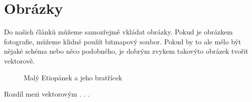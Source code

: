 \documentclass[a4paper, 11pt]{article}
\begin{document}
\section{Obrázky}
Do našich článků můžeme samozřejmě vkládat obrázky. Pokud je obrázkem fotografie, můžeme klidně použít bitmapový soubor. Pokud by to ale mělo být nějaké schéma nebo něco podobného, je dobrým zvykem takovýto obrázek tvořit vektorově.

\begin{figure}[ht]
    \begin{center}
    \end{center}
    \caption{Malý Etiopánek a jeho bratřícek}
    \label{etiop}
\end{figure}
	
Rozdíl mezi vektorovým . . .
\beg
\end{document}
